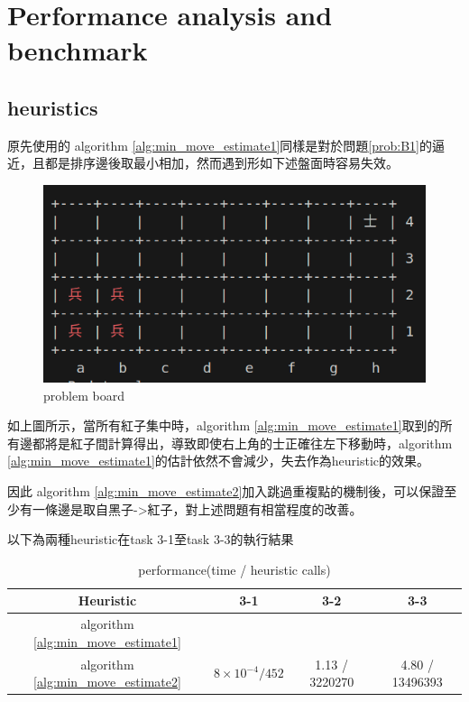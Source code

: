 \documentclass[a4paper, 12pt]{article}  %
\begin{document}
\newpage
\section{Performance analysis and benchmark}
\subsection{heuristics}
原先使用的 algorithm \ref{alg:min_move_estimate1}同樣是對於問題\ref{prob:B1}的逼近，且都是排序邊後取最小相加，然而遇到形如下述盤面時容易失效。
\begin{figure}[!h]
    \caption{problem board}
    \includegraphics[totalheight=6cm]{board.png}
\end{figure}
如上圖所示，當所有紅子集中時，algorithm \ref{alg:min_move_estimate1}取到的所有邊都將是紅子間計算得出，導致即使右上角的士正確往左下移動時，algorithm \ref{alg:min_move_estimate1}的估計依然不會減少，失去作為heuristic的效果。

因此 algorithm \ref{alg:min_move_estimate2}加入跳過重複點的機制後，可以保證至少有一條邊是取自黑子->紅子，對上述問題有相當程度的改善。

以下為兩種heuristic在task 3-1至task 3-3的執行結果


\begin{table}[!h]
    \begin{tabular}{c c c c}
        Heuristic & 3-1 & 3-2 & 3-3 \\
        \hline
        algorithm \ref{alg:min_move_estimate1} & \\
        algorithm \ref{alg:min_move_estimate2} & $8\times 10^{-4} / 452$ & 1.13 / 3220270 & 4.80 / 13496393
    \end{tabular}
    \caption{performance(time / heuristic calls)}
\end{table}

\end{document}
